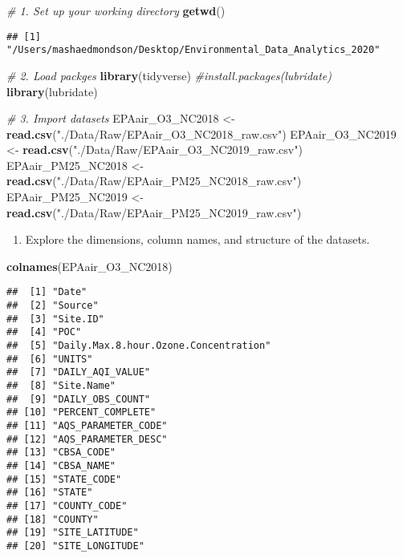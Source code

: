 \documentclass[]{article}
\newenvironment{Shaded}{\begin{snugshade}}{\end{snugshade}}
\newcommand{\CommentTok}[1]{\textcolor[rgb]{0.56,0.35,0.01}{\textit{#1}}}
\newcommand{\KeywordTok}[1]{\textcolor[rgb]{0.13,0.29,0.53}{\textbf{#1}}}
\newcommand{\NormalTok}[1]{#1}
\newcommand{\StringTok}[1]{\textcolor[rgb]{0.31,0.60,0.02}{#1}}
\providecommand{\tightlist}{%
  \setlength{\itemsep}{0pt}\setlength{\parskip}{0pt}}
\begin{document}
\begin{Shaded}
\begin{Highlighting}[]
\CommentTok{# 1. Set up your working directory}
\KeywordTok{getwd}\NormalTok{()}
\end{Highlighting}
\end{Shaded}

\begin{verbatim}
## [1] "/Users/mashaedmondson/Desktop/Environmental_Data_Analytics_2020"
\end{verbatim}

\begin{Shaded}
\begin{Highlighting}[]
\CommentTok{# 2. Load packges}
\KeywordTok{library}\NormalTok{(tidyverse)}
\CommentTok{#install.packages(lubridate)}
\KeywordTok{library}\NormalTok{(lubridate)}

\CommentTok{# 3. Import datasets}
\NormalTok{EPAair_O3_NC2018 <-}\StringTok{ }\KeywordTok{read.csv}\NormalTok{(}\StringTok{"./Data/Raw/EPAair_O3_NC2018_raw.csv"}\NormalTok{)}
\NormalTok{EPAair_O3_NC2019 <-}\StringTok{ }\KeywordTok{read.csv}\NormalTok{(}\StringTok{"./Data/Raw/EPAair_O3_NC2019_raw.csv"}\NormalTok{)}
\NormalTok{EPAair_PM25_NC2018 <-}\StringTok{ }\KeywordTok{read.csv}\NormalTok{(}\StringTok{"./Data/Raw/EPAair_PM25_NC2018_raw.csv"}\NormalTok{)}
\NormalTok{EPAair_PM25_NC2019 <-}\StringTok{ }\KeywordTok{read.csv}\NormalTok{(}\StringTok{"./Data/Raw/EPAair_PM25_NC2019_raw.csv"}\NormalTok{)}
\end{Highlighting}
\end{Shaded}

\begin{enumerate}
\def\labelenumi{\arabic{enumi}.}
\setcounter{enumi}{1}
\tightlist
\item
  Explore the dimensions, column names, and structure of the datasets.
\end{enumerate}

\begin{Shaded}
\begin{Highlighting}[]
\KeywordTok{colnames}\NormalTok{(EPAair_O3_NC2018)}
\end{Highlighting}
\end{Shaded}

\begin{verbatim}
##  [1] "Date"                                
##  [2] "Source"                              
##  [3] "Site.ID"                             
##  [4] "POC"                                 
##  [5] "Daily.Max.8.hour.Ozone.Concentration"
##  [6] "UNITS"                               
##  [7] "DAILY_AQI_VALUE"                     
##  [8] "Site.Name"                           
##  [9] "DAILY_OBS_COUNT"                     
## [10] "PERCENT_COMPLETE"                    
## [11] "AQS_PARAMETER_CODE"                  
## [12] "AQS_PARAMETER_DESC"                  
## [13] "CBSA_CODE"                           
## [14] "CBSA_NAME"                           
## [15] "STATE_CODE"                          
## [16] "STATE"                               
## [17] "COUNTY_CODE"                         
## [18] "COUNTY"                              
## [19] "SITE_LATITUDE"                       
## [20] "SITE_LONGITUDE"
\end{verbatim}
\end{document}
